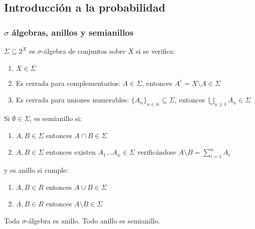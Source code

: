 \subsection{Introducción a la probabilidad}
 \begin{frame}\frametitle{$\sigma$ álgebras, anillos y semianillos}
  \begin{definition}
   $\Sigma \subseteq 2^X$ es $\sigma$-álgebra de conjuntos sobre $X$ si se verifica:
   
   \begin{enumerate}[i]
    \item $X \in \Sigma$
    \item Es cerrada para complementarios: $A\in \Sigma$, entonces $A^c = X\setminus A \in \Sigma$
    \item Es cerrada para uniones numerables: $\{A_n\}_{n\in\mathbb{N}} \subseteq \Sigma$, entonces 
    $\underset{n \ge 1}{\bigcup} A_n \in \Sigma$
   \end{enumerate}
   
   Si $\emptyset \in \Sigma$, es semianillo si:
   \begin{enumerate}[i]
    \item $A,B \in \Sigma$ entonces $A\cap B \in \Sigma$
    \item $A,B \in \Sigma$ entonces existen $A_1 \ldots A_n \in \Sigma$ verificándose $A\setminus B = \sum_{i=1}^n A_i$
   \end{enumerate}

   y es anillo si cumple:
   \begin{enumerate}[i]
    \item $A,B \in R$ entonces $A\cup B \in \Sigma$
    \item $A,B \in R$ entonces $A\setminus B \in \Sigma$
   \end{enumerate}
  \end{definition}

  \begin{fact}
  Toda $\sigma$-álgebra es anillo. Todo anillo es semianillo.
  \end{fact}
 \end{frame}
 
